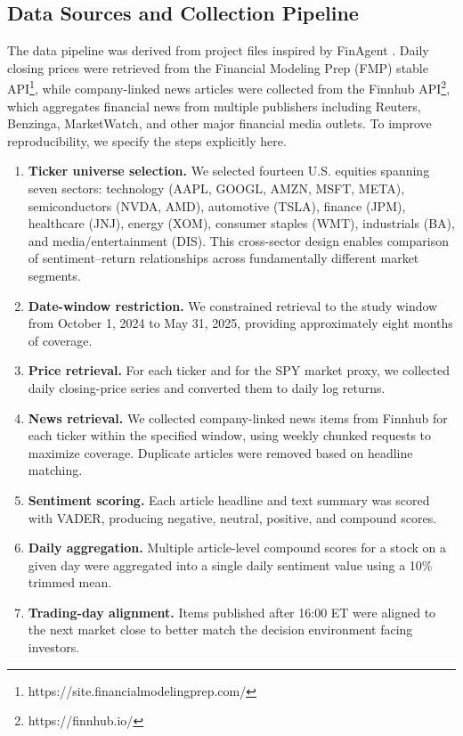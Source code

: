 \documentclass[lettersize,journal]{IEEEtran}
\begin{document}
\subsection{Data Sources and Collection Pipeline}
The data pipeline was derived from project files inspired by FinAgent \cite{zhang2024finagent}. Daily closing prices were retrieved from the Financial Modeling Prep (FMP) stable API\footnote{https://site.financialmodelingprep.com/}, while company-linked news articles were collected from the Finnhub API\footnote{https://finnhub.io/}, which aggregates financial news from multiple publishers including Reuters, Benzinga, MarketWatch, and other major financial media outlets. To improve reproducibility, we specify the steps explicitly here.

\begin{enumerate}
    \item \textbf{Ticker universe selection.} We selected fourteen U.S. equities spanning seven sectors: technology (AAPL, GOOGL, AMZN, MSFT, META), semiconductors (NVDA, AMD), automotive (TSLA), finance (JPM), healthcare (JNJ), energy (XOM), consumer staples (WMT), industrials (BA), and media/entertainment (DIS). This cross-sector design enables comparison of sentiment--return relationships across fundamentally different market segments.
    \item \textbf{Date-window restriction.} We constrained retrieval to the study window from October 1, 2024 to May 31, 2025, providing approximately eight months of coverage.
    \item \textbf{Price retrieval.} For each ticker and for the SPY market proxy, we collected daily closing-price series and converted them to daily log returns.
    \item \textbf{News retrieval.} We collected company-linked news items from Finnhub for each ticker within the specified window, using weekly chunked requests to maximize coverage. Duplicate articles were removed based on headline matching.
    \item \textbf{Sentiment scoring.} Each article headline and text summary was scored with VADER, producing negative, neutral, positive, and compound scores.
    \item \textbf{Daily aggregation.} Multiple article-level compound scores for a stock on a given day were aggregated into a single daily sentiment value using a 10\% trimmed mean.
    \item \textbf{Trading-day alignment.} Items published after 16:00 ET were aligned to the next market close to better match the decision environment facing investors.
\end{enumerate}
\end{document}
